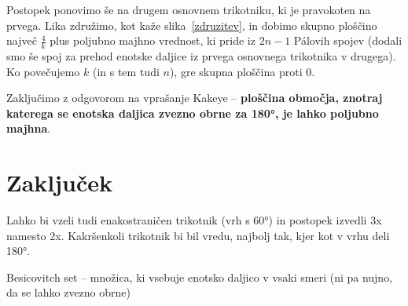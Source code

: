 \documentclass[a4paper, 12pt]{article}
\begin{document}
Postopek ponovimo še na drugem osnovnem trikotniku, ki je pravokoten na prvega. Lika združimo, kot kaže slika~\ref{zdruzitev}, in dobimo skupno ploščino največ $ \frac{4}{k} $ plus poljubno majhno vrednost, ki pride iz $ 2n - 1 $ Pálovih spojev (dodali smo še spoj za prehod enotske daljice iz prvega osnovnega trikotnika v drugega). Ko povečujemo $ k $ (in s tem tudi $ n $), gre skupna ploščina proti 0.

Zaključimo z odgovorom na vprašanje Kakeye -- \textbf{ploščina območja, znotraj katerega se enotska daljica zvezno obrne za 180°, je lahko poljubno majhna}.

\section*{Zaključek}

Lahko bi vzeli tudi enakostraničen trikotnik (vrh s 60°) in postopek izvedli 3x namesto 2x. Kakršenkoli trikotnik bi bil vredu, najbolj tak, kjer kot v vrhu deli 180°.

Besicovitch set -- množica, ki vsebuje enotsko daljico v vsaki smeri (ni pa nujno, da se lahko zvezno obrne)

\newpage
\printbibliography[heading=bibintoc, title={Literatura}]

\end{document}
